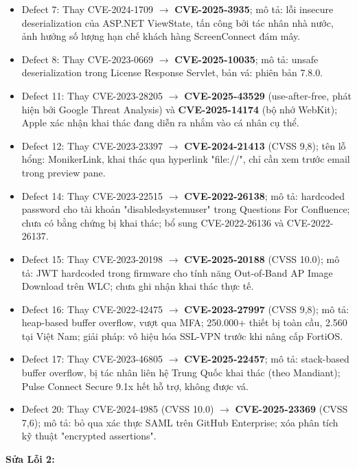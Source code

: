 \begin{itemize}
    \item Defect 7: Thay CVE-2024-1709 $\rightarrow$ \textbf{CVE-2025-3935}; mô tả: lỗi insecure deserialization của ASP.NET ViewState, tấn công bởi tác nhân nhà nước, ảnh hưởng số lượng hạn chế khách hàng ScreenConnect đám mây.
    \item Defect 8: Thay CVE-2023-0669 $\rightarrow$ \textbf{CVE-2025-10035}; mô tả: unsafe deserialization trong License Response Servlet, bản vá: phiên bản 7.8.0.
    \item Defect 11: Thay CVE-2023-28205 $\rightarrow$ \textbf{CVE-2025-43529} (use-after-free, phát hiện bởi Google Threat Analysis) và \textbf{CVE-2025-14174} (bộ nhớ WebKit); Apple xác nhận khai thác đang diễn ra nhắm vào cá nhân cụ thể.
    \item Defect 12: Thay CVE-2023-23397 $\rightarrow$ \textbf{CVE-2024-21413} (CVSS 9,8); tên lỗ hổng: MonikerLink, khai thác qua hyperlink "file://", chỉ cần xem trước email trong preview pane.
    \item Defect 14: Thay CVE-2023-22515 $\rightarrow$ \textbf{CVE-2022-26138}; mô tả: hardcoded password cho tài khoản "disabledsystemuser" trong Questions For Confluence; chưa có bằng chứng bị khai thác; bổ sung CVE-2022-26136 và CVE-2022-26137.
    \item Defect 15: Thay CVE-2023-20198 $\rightarrow$ \textbf{CVE-2025-20188} (CVSS 10.0); mô tả: JWT hardcoded trong firmware cho tính năng Out-of-Band AP Image Download trên WLC; chưa ghi nhận khai thác thực tế.
    \item Defect 16: Thay CVE-2022-42475 $\rightarrow$ \textbf{CVE-2023-27997} (CVSS 9,8); mô tả: heap-based buffer overflow, vượt qua MFA; 250.000+ thiết bị toàn cầu, 2.560 tại Việt Nam; giải pháp: vô hiệu hóa SSL-VPN trước khi nâng cấp FortiOS.
    \item Defect 17: Thay CVE-2023-46805 $\rightarrow$ \textbf{CVE-2025-22457}; mô tả: stack-based buffer overflow, bị tác nhân liên hệ Trung Quốc khai thác (theo Mandiant); Pulse Connect Secure 9.1x hết hỗ trợ, không được vá.
    \item Defect 20: Thay CVE-2024-4985 (CVSS 10.0) $\rightarrow$ \textbf{CVE-2025-23369} (CVSS 7,6); mô tả: bỏ qua xác thực SAML trên GitHub Enterprise; xóa phân tích kỹ thuật "encrypted assertions".
\end{itemize}

\vspace{0.2cm}

\textbf{Sửa Lỗi 2:}

